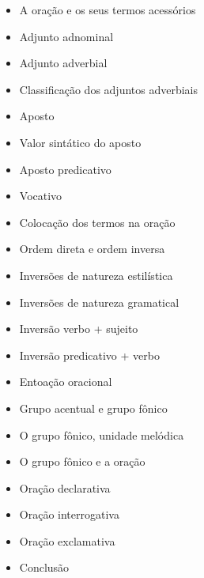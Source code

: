 \documentclass[a4paper,12pt]{article}[abntex2]
\begin{document}
\begin{itemize}
    \item A oração e os seus termos acessórios
    \item Adjunto adnominal
    \item Adjunto adverbial
    \item Classificação dos adjuntos adverbiais
    \item Aposto
    \item Valor sintático do aposto
    \item Aposto predicativo
    \item Vocativo
    \item Colocação dos termos na oração
    \item Ordem direta e ordem inversa
    \item Inversões de natureza estilística
    \item Inversões de natureza gramatical
    \item Inversão verbo + sujeito
    \item Inversão predicativo + verbo
    \item Entoação oracional
    \item Grupo acentual e grupo fônico
    \item O grupo fônico, unidade melódica
    \item O grupo fônico e a oração
    \item Oração declarativa
    \item Oração interrogativa
    \item Oração exclamativa
    \item Conclusão
\end{itemize}
\end{document}
